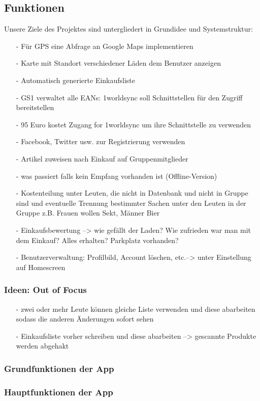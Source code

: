 \documentclass[12pt,a4paper]{article}
\begin{document}
\subsection{Funktionen}
Unsere Ziele des Projektes sind untergliedert in Grundidee und Systemstruktur:
\begin{itemize}
\item[-] Für GPS eine Abfrage an Google Maps implementieren
\item[-] Karte mit Standort verschiedener Läden dem Benutzer anzeigen
\item[-] Automatisch generierte Einkaufsliste
\item[-] GS1 verwaltet alle EANs: 1worldsync soll Schnittstellen für den Zugriff bereitstellen
\item[-] 95 Euro kostet Zugang for 1worldsync um ihre Schnittstelle zu verwenden
\item[-] Facebook, Twitter usw. zur Registrierung verwenden
\item[-] Artikel zuweisen nach Einkauf auf Gruppenmitglieder 
\item[-] was passiert falls kein Empfang vorhanden ist (Offline-Version)
\item[-] Kostenteilung unter Leuten, die nicht in Datenbank und nicht in Gruppe sind und eventuelle Trennung bestimmter Sachen unter den Leuten in der Gruppe z.B. Frauen wollen Sekt, Männer Bier
\item[-] Einkaufsbewertung --> wie gefällt der Laden? Wie zufrieden war man mit dem Einkauf? Alles erhalten? Parkplatz 
vorhanden?
\item[-] Benutzerverwaltung: Profilbild, Account löschen, etc.--> unter Einstellung auf Homescreen
\end{itemize}
\subsubsection*{Ideen: Out of Focus}
\begin{itemize}
\item[-] zwei oder mehr Leute können gleiche Liste verwenden und diese abarbeiten sodass die anderen Änderungen sofort sehen
\item[-] Einkaufsliste vorher schreiben und diese abarbeiten --> gescannte Produkte werden abgehakt
\end{itemize}
\subsubsection{Grundfunktionen der App}
\subsubsection{Hauptfunktionen der App}
\end{document}
